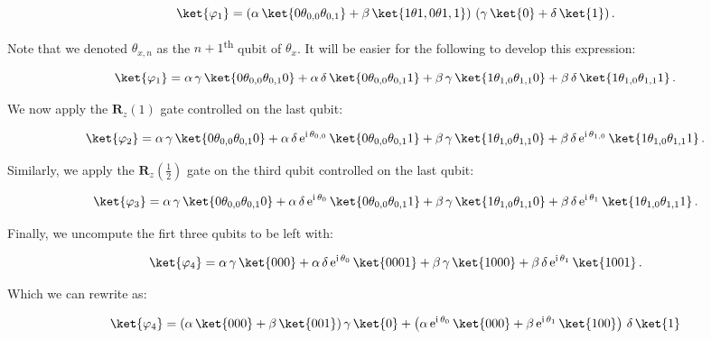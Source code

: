 \documentclass[11pt, a4paper]{article}
\begin{document}
                \[\ket{\varphi_1} = \left(\alpha\,\ket{0\theta_{0,0}\theta_{0,1}} + \beta\,\ket{1\theta{1,0}\theta{1,1}}\right)\,(\gamma\,\ket{0} + \delta\,\ket{1})\,.\]
                
                Note that we denoted \(\theta_{x, n}\) as the \(n+1\)\textsuperscript{th} qubit of \(\theta_x\). It will be easier for the following to develop this expression:
                
                \[\ket{\varphi_1} = \alpha\,\gamma\,\ket{0\theta_{0,0}\theta_{0,1}0} + \alpha\,\delta\,\ket{0\theta_{0,0}\theta_{0,1}1} + \beta\,\gamma\,\ket{1\theta_{1,0}\theta_{1,1}0} + \beta\,\delta\,\ket{1\theta_{1,0}\theta_{1,1}1}\,.\]
                
                We now apply the \(\mathbf{R}_z(1)\) gate controlled on the last qubit:
                
                \[\ket{\varphi_2} = \alpha\,\gamma\,\ket{0\theta_{0,0}\theta_{0,1}0} + \alpha\,\delta\,\mathrm{e}^{\mathrm{i}\,\theta_{0,0}}\,\ket{0\theta_{0,0}\theta_{0,1}1} + \beta\,\gamma\,\ket{1\theta_{1,0}\theta_{1,1}0} + \beta\,\delta\,\mathrm{e}^{\mathrm{i}\,\theta_{1,0}}\,\ket{1\theta_{1,0}\theta_{1,1}1}\,.\]
                
                Similarly, we apply the \(\mathbf{R}_z\left(\frac12\right)\) gate on the third qubit controlled on the last qubit:
                
                \[\ket{\varphi_3} = \alpha\,\gamma\,\ket{0\theta_{0,0}\theta_{0,1}0} + \alpha\,\delta\,\mathrm{e}^{\mathrm{i}\,\theta_{0}}\,\ket{0\theta_{0,0}\theta_{0,1}1} + \beta\,\gamma\,\ket{1\theta_{1,0}\theta_{1,1}0} + \beta\,\delta\,\mathrm{e}^{\mathrm{i}\,\theta_{1}}\,\ket{1\theta_{1,0}\theta_{1,1}1}\,.\]
                
                Finally, we uncompute the firt three qubits to be left with:
                
                \[\ket{\varphi_4} = \alpha\,\gamma\,\ket{000} + \alpha\,\delta\,\mathrm{e}^{\mathrm{i}\,\theta_{0}}\,\ket{0001} + \beta\,\gamma\,\ket{1000} + \beta\,\delta\,\mathrm{e}^{\mathrm{i}\,\theta_{1}}\,\ket{1001}\,.\]
                
                Which we can rewrite as:
                
                \[\ket{\varphi_4} = (\alpha\,\ket{000} + \beta\,\ket{001})\,\gamma\,\ket{0} + \left(\alpha\,\mathrm{e}^{\mathrm{i}\,\theta_0}\,\ket{000}+\beta\,\mathrm{e}^{\mathrm{i}\,\theta_1}\,\ket{100}\right)\,\delta\,\ket{1}\]
                
\end{document}
